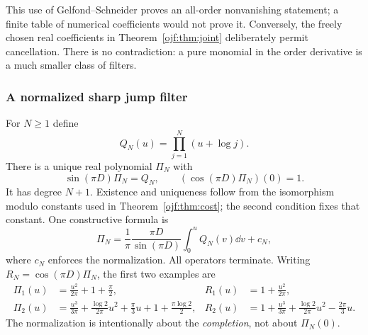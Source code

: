 This use of Gelfond--Schneider proves an all-order nonvanishing statement;
a finite table of numerical coefficients would not prove it. Conversely,
the freely chosen real coefficients in Theorem~\ref{ojf:thm:joint} deliberately
permit cancellation. There is no contradiction: a pure monomial in the
order derivative is a much smaller class of filters.

\subsubsection{A normalized sharp jump filter}
For $N\ge1$ define
\begin{equation}\label{ojf:eq:QN}
 Q_N(u)=\prod_{j=1}^N(u+\log j).
\end{equation}
There is a unique real polynomial $\Pi_N$ with
\begin{equation}\label{ojf:eq:PiN}
 \sin(\pi D)\Pi_N=Q_N,\qquad
      (\cos(\pi D)\Pi_N)(0)=1.
\end{equation}
It has degree $N+1$. Existence and uniqueness follow from the
isomorphism modulo constants used in Theorem~\ref{ojf:thm:cost}; the second
condition fixes that constant. One constructive formula is
\[
 \Pi_N=\frac1\pi\frac{\pi D}{\sin(\pi D)}
               \int_0^u Q_N(v)\dd v+c_N,
\]
where $c_N$ enforces the normalization. All operators terminate.
Writing $R_N=\cos(\pi D)\Pi_N$, the first two examples are
\begin{align}
 \Pi_1(u)&=\frac{u^2}{2\pi}+1+\frac\pi2,
 &R_1(u)&=1+\frac{u^2}{2\pi},\label{ojf:eq:Pi1}\\
 \Pi_2(u)&=\frac{u^3}{3\pi}+
       \frac{\log2}{2\pi}u^2+\frac\pi3u+1+\frac{\pi\log2}{2},
 &R_2(u)&=1+\frac{u^3}{3\pi}+
       \frac{\log2}{2\pi}u^2-\frac{2\pi}{3}u.
                                                        \label{ojf:eq:Pi2}
\end{align}
The normalization is intentionally about the \emph{completion}, not
about $\Pi_N(0)$.

